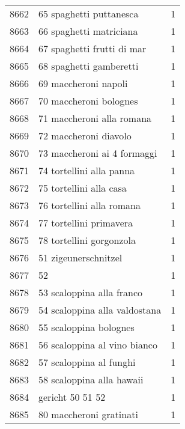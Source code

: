 \begin{tabular}{llr}
8662 &                            65 spaghetti puttanesca &      1 \\
8663 &                            66 spaghetti matriciana &      1 \\
8664 &                         67 spaghetti frutti di mar &      1 \\
8665 &                            68 spaghetti gamberetti &      1 \\
8666 &                               69 maccheroni napoli &      1 \\
8667 &                             70 maccheroni bolognes &      1 \\
8668 &                          71 maccheroni alla romana &      1 \\
8669 &                              72 maccheroni diavolo &      1 \\
8670 &                        73 maccheroni ai 4 formaggi &      1 \\
8671 &                           74 tortellini alla panna &      1 \\
8672 &                            75 tortellini alla casa &      1 \\
8673 &                          76 tortellini alla romana &      1 \\
8674 &                            77 tortellini primavera &      1 \\
8675 &                           78 tortellini gorgonzola &      1 \\
8676 &                               51 zigeunerschnitzel &      1 \\
8677 &                                                 52 &      1 \\
8678 &                          53 scaloppina alla franco &      1 \\
8679 &                      54 scaloppina alla valdostana &      1 \\
8680 &                             55 scaloppina bolognes &      1 \\
8681 &                       56 scaloppina al vino bianco &      1 \\
8682 &                            57 scaloppina al funghi &      1 \\
8683 &                          58 scaloppina alla hawaii &      1 \\
8684 &                                   gericht 50 51 52 &      1 \\
8685 &                            80 maccheroni gratinati &      1 \\

\end{tabular}
